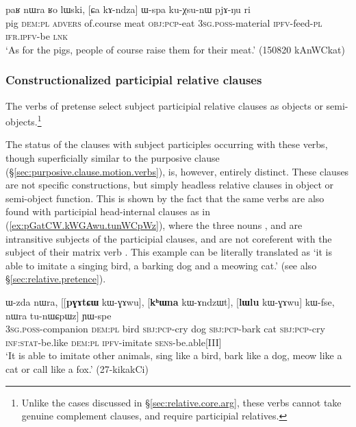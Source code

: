 \begin{exe}
	\ex \label{ex:Ca.kAndza.Wspa}
	\gll paʁ nɯra ʁo lɯski, [ɕa kɤ-ndza] ɯ-spa ku-χsu-nɯ pjɤ-ŋu ri \\
	pig \textsc{dem}:\textsc{pl} \textsc{advers} of.course meat \textsc{obj}:\textsc{pcp}-eat \textsc{3sg}.\textsc{poss}-material \textsc{ipfv}-feed-\textsc{pl} \textsc{ifr}.\textsc{ipfv}-be \textsc{lnk} \\
	\glt `As for the pigs, people of course raise them for their meat.' (150820 kAnWCkat)
\end{exe}



\subsubsection{Constructionalized participial relative clauses} \label{sec:constr.participial.clause}
The verbs of pretense select subject participial relative clauses as objects or semi-objects.\footnote{Unlike the cases discussed in §\ref{sec:relative.core.arg}, these verbs cannot take genuine complement clauses, and require participial relatives. } 

The status of the clauses with subject participles occurring with these verbs, though superficially similar to the purposive clause (§\ref{sec:purposive.clause.motion.verbs}), is, however, entirely distinct. These clauses are not specific constructions, but simply headless relative clauses in object or semi-object function. This is shown by the fact that the same verbs are also found with participial head-internal clauses as in (\ref{ex:pGatCW.kWGAwu.tunWCpWz}), where the three nouns ,  and  are intransitive subjects of the participial clauses, and are not coreferent with the subject of their matrix verb . This example can be literally translated as `it is able to imitate a singing bird, a barking dog and a meowing cat.' (see also  §\ref{sec:relative.pretence}).

\begin{exe}
	\ex \label{ex:pGatCW.kWGAwu.tunWCpWz}
	\gll ɯ-zda nɯra, [[\textbf{pɣɤtɕɯ} kɯ-ɣɤwu], [\textbf{kʰɯna} kɯ-ɤndzɯt], [\textbf{lɯlu} kɯ-ɣɤwu] kɯ-fse, nɯra tu-nɯɕpɯz] ɲɯ-spe \\
	\textsc{3sg}.\textsc{poss}-companion \textsc{dem}:\textsc{pl} bird \textsc{sbj}:\textsc{pcp}-cry dog \textsc{sbj}:\textsc{pcp}-bark cat \textsc{sbj}:\textsc{pcp}-cry \textsc{inf}:\textsc{stat}-be.like \textsc{dem}:\textsc{pl} \textsc{ipfv}-imitate \textsc{sens}-be.able[III] \\
	\glt `It is able to imitate other animals, sing like a bird, bark like a dog, meow like a cat or call like a fox.' (27-kikakCi)
\end{exe}

